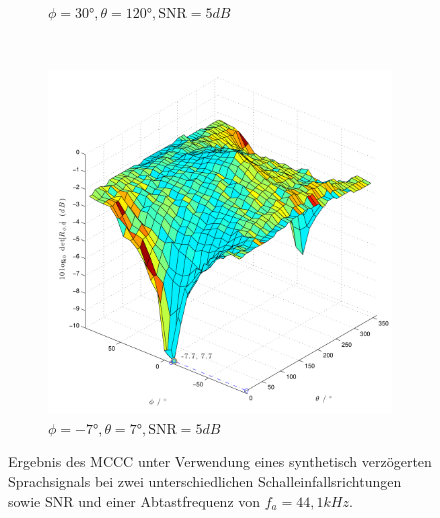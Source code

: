 \begin{figure}
\begin{subfigure}[b]{0.48\textwidth}
                \caption{$\phi=30°,\theta=120°, \mathrm{SNR}=5dB$}
                \label{fig:Sim_Phi_30_Theta_120_dB_SNR_5dB}
        \end{subfigure}
        ~ %
        \begin{subfigure}[b]{0.48\textwidth}
                \centering
                \includegraphics[width=\textwidth]{grafiken/02_Konzeptionierung/Sim_voice_Phi_-7_Theta_7_SNR_5dB_log}
                \caption{$\phi=-7°,\theta=7°, \mathrm{SNR}=5dB$}
                \label{fig:Sim_Phi_-7_Theta_7_dB_SNR_5dB}
        \end{subfigure}
        \caption{Ergebnis des MCCC unter Verwendung eines synthetisch verzögerten Sprachsignals bei zwei unterschiedlichen Schalleinfallsrichtungen sowie SNR und einer Abtastfrequenz von $f_a=44,1kHz$.}
        \label{fig:Sim_Synthetic_dB}
\end{figure}
         
